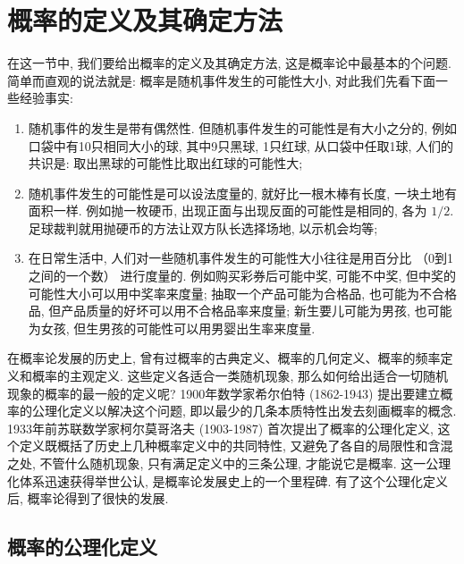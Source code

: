 \section{概率的定义及其确定方法}

在这一节中,
我们要给出概率的定义及其确定方法,
这是概率论中最基本的个问题.
简单而直观的说法就是:
概率是随机事件发生的可能性大小,
对此我们先看下面一些经验事实:
\begin{enumerate}
  \item 随机事件的发生是带有偶然性.
  但随机事件发生的可能性是有大小之分的,
  例如口袋中有10只相同大小的球,
  其中9只黑球,
  1只红球,
  从口袋中任取1球,
  人们的共识是:
  取出黑球的可能性比取出红球的可能性大;
  \item 随机事件发生的可能性是可以设法度量的,
  就好比一根木棒有长度,
  一块土地有面积一样.
  例如抛一枚硬币,
  出现正面与出现反面的可能性是相同的,
  各为 $1/2$.
  足球裁判就用抛硬币的方法让双方队长选择场地,
  以示机会均等;
  \item 在日常生活中,
  人们对一些随机事件发生的可能性大小往往是用百分比 （0到1之间的一个数） 进行度量的.
  例如购买彩券后可能中奖,
  可能不中奖,
  但中奖的可能性大小可以用中奖率来度量;
  抽取一个产品可能为合格品,
  也可能为不合格品,
  但产品质量的好坏可以用不合格品率来度量;
  新生要儿可能为男孩,
  也可能为女孩,
  但生男孩的可能性可以用男婴出生率来度量.
\end{enumerate}

在概率论发展的历史上,
曾有过概率的古典定义、概率的几何定义、概率的频率定义和概率的主观定义.
这些定义各适合一类随机现象,
那么如何给出适合一切随机现象的概率的最一般的定义呢?
1900年数学家希尔伯特 (1862-1943) 提出要建立概率的公理化定义以解决这个问题,
即以最少的几条本质特性出发去刻画概率的概念.
1933年前苏联数学家柯尔莫哥洛夫 (1903-1987) 首次提出了概率的公理化定义,
这个定义既概括了历史上几种概率定义中的共同特性,
又避免了各自的局限性和含混之处,
不管什么随机现象,
只有满足定义中的三条公理,
才能说它是概率.
这一公理化体系迅速获得举世公认,
是概率论发展史上的一个里程碑.
有了这个公理化定义后,
概率论得到了很快的发展.

\subsection{概率的公理化定义}

